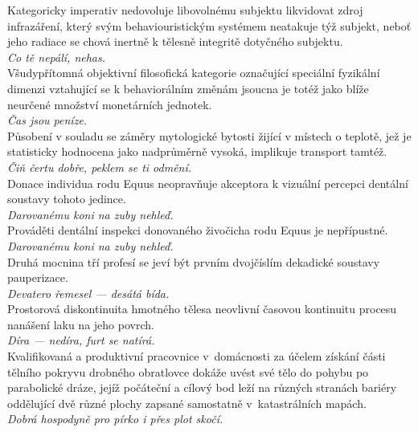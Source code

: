 \begin{multicols}{2}
\noindent
Kategoricky imperativ nedovoluje libovolnému subjektu likvidovat
zdroj infrazáření, který svým behaviouristickým systémem neatakuje
týž subjekt, neboť jeho radiace se chová inertně k tělesně integritě
dotyčného subjektu.\\[1 mm]
{\sl Co tě nepálí, nehas.}\\

\noindent
Všudypřítomná objektivní filosofická kategorie označující
speciální fyzikální dimenzi vztahující se k behaviorálním změnám
jsoucna je totéž jako blíže neurčené množství monetárních jednotek.\\[1 mm]
{\sl Čas jsou peníze.}\\

\noindent
Působení v souladu se záměry mytologické bytosti žijící v
místech o teplotě, jež je statisticky hodnocena jako nadprůměrně
vysoká, implikuje transport tamtéž.\\[1 mm]
{\sl Čiň čertu dobře, peklem se ti odmění.}\\

\noindent
Donace individua rodu Equus neopravňuje akceptora k vizuální
percepci dentální soustavy tohoto jedince.\\[1 mm]
{\sl Darovanému koni na zuby nehleď.}\\

\noindent
Prováděti dentální inspekci donovaného živočicha rodu Equus
je nepřípustné.\\[1 mm]
{\sl Darovanému koni na zuby nehleď.}\\

\noindent
Druhá mocnina tří profesí se jeví být prvním dvojčíslím dekadické
soustavy pauperizace.\\[1 mm]
{\sl Devatero řemesel --- desátá bída.}\\

\noindent
Prostorová diskontinuita hmotného tělesa neovlivní časovou
kontinuitu procesu nanášení laku na jeho povrch.\\[1 mm]
{\sl Díra --- nedíra, furt se natírá.}\\

\noindent
Kvalifikovaná a produktivní pracovnice v~domácnosti
za účelem získání části tělního pokryvu drobného obratlovce dokáže
uvést své tělo do pohybu po parabolické dráze, jejíž počáteční
a cílový bod leží na různých stranách bariéry oddělující dvě
různé plochy zapsané samostatně v~katastrálních mapách.\\[1 mm]
{\sl Dobrá hospodyně pro pírko i přes plot skočí.}\\


\end{multicols}
